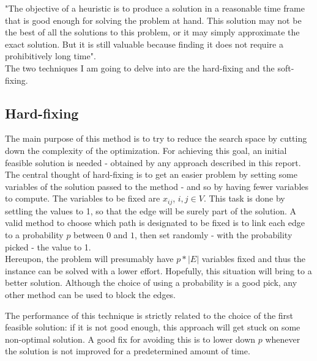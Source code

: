 "The objective of a heuristic is to produce a solution in a reasonable time frame that is good enough for solving the problem at hand. This solution may not be the best of all the solutions to this problem, or it may simply approximate the exact solution. But it is still valuable because finding it does not require a prohibitively long time"\cite{heuristic}.\\
The two techniques I am going to delve into are the hard-fixing and the soft-fixing.

\subsection{Hard-fixing}
\label{section:hard-fix}
The main purpose of this method is to try to reduce the search space by cutting down the complexity of the optimization. For achieving this goal, an initial feasible solution is needed - obtained by any approach described in this report.\\
The central thought of hard-fixing is to get an easier problem by setting some variables of the solution passed to the method - and so by having fewer variables to compute. The variables to be fixed are $x_{ij}$, $i, j\in V$. This task is done by settling the values to 1, so that the edge will be surely part of the solution. A valid method to choose which path is designated to be fixed is to link each edge to a probability $p$ between $0$ and $1$, then set randomly - with the probability picked - the value to 1.\\
Hereupon, the problem will presumably have $p*|E|$ variables fixed and thus the instance can be solved with a lower effort. Hopefully, this situation will bring to a better solution. Although the choice of using a probability is a good pick, any other method can be used to block the edges.

The performance of this technique is strictly related to the choice of the first feasible solution: if it is not good enough, this approach will get stuck on some non-optimal solution. A good fix for avoiding this is to lower down $p$ whenever the solution is not improved for a predetermined amount of time.

